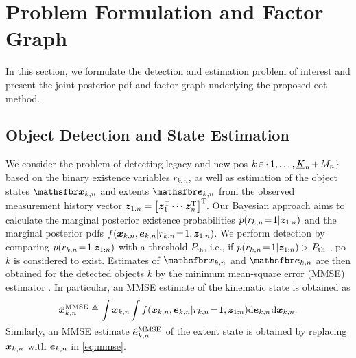 \documentclass[10pt, twoside, romanappendices]{IEEEtran}
\providecommand{\ist}{\hspace*{.3mm}}
\providecommand{\rmv}{\hspace*{-.3mm}}
\providecommand{\nn}{\nonumber}
\newcommand{\T}{\text{T}}
\begin{document}
\begin{figure}[t!]
\label{fig:FactorGraph}
\end{figure}

\section{Problem Formulation and Factor Graph}
\label{sec:factorGraphProblem}

\vspace{.5mm}

In this section, we formulate the detection and estimation problem of interest and present the joint posterior pdf and factor graph underlying the proposed \ac{eot} method.

\vspace{-1mm}


 \subsection{Object Detection and State Estimation}
\label{sec:prob}

\vspace{.5mm}

We consider the problem of detecting legacy and new \acp{po} $k \!\in\! \{1,\dots,\underline{K}_n \rmv+\rmv M_n\}$ based on the binary existence variables $r_{k,n}$, as well as estimation of the object states $\RV{x}_{k,n}$ and extents $\RV{e}_{k,n}$ from the observed measurement history vector $\V{z}_{1:n} = \big[\V{z}_1^{\T} \cdots\ist \V{z}^{\T}_n \big]^{\T}\!$. Our Bayesian approach aims to calculate the marginal posterior existence probabilities $p(r_{k,n} \!=\! 1|\bm{z}_{1:n})$ and the marginal posterior pdfs $f(\bm{x}_{k,n}, \bm{e}_{k,n}  | r_{k,n} \!=\! 1, \bm{z}_{1:n} )$. We perform detection by comparing $p(r_{k,n} \!=\! 1|\bm{z}_{1:n})$ with a threshold $P_{\text{th}}$, i.e., if $p(r_{k,n} \!=\! 1|\bm{z}_{1:n}) > P_{\text{th}}$ \cite[Ch.~2]{Poo:B94}, \ac{po} $k$ is considered to exist. Estimates of $\RV{x}_{k,n}$ and $\RV{e}_{k,n}$ are  then obtained for the detected objects $k$ by the minimum mean-square error (MMSE) estimator \cite[Ch.~4]{Poo:B94}. In particular, an MMSE estimate of the kinematic state is obtained \vspace{1mm} as
\vspace{-1mm}
\begin{align}
\hat{\V{x}}^\text{MMSE}_{k,n} &\triangleq \int \rmv \V{x}_{k,n} \rmv  \int  f(\V{x}_{k,n}, \V{e}_{k,n}  | r_{k,n} \!=\! 1, \V{z}_{1:n} ) \mathrm{d}\V{e}_{k,n} \ist \mathrm{d}\V{x}_{k,n}. \nn\\[-1mm]
\label{eq:mmse}
\end{align}
Similarly, an MMSE estimate $\hat{\bm{e}}^\text{MMSE}_{k,n}$ of the extent state is obtained by replacing $\bm{x}_{k,n}$ with $\bm{e}_{k,n}$ in \eqref{eq:mmse}. 
\end{document}
